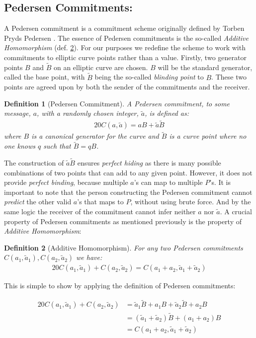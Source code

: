 \documentclass{article}
\newtheorem{definition}{Definition}[section]
\newcommand{\eq}[1]{\begin{alignat*}{20}#1\end{alignat*}}
\newcommand{\blind}[1]{\widetilde{#1}}
\newcommand{\ba}{\blind{a}}
\newcommand{\bB}{\blind{B}}
\begin{document}
\subsection{Pedersen Commitments:} \label{pedersen-commitments}

A Pedersen commitment is a commitment scheme originally defined by
Torben Pryds Pedersen \cite{pedersen}. The essence of Pedersen
commitments is the so-called \textit{Additive Homomorphism}
(def. \ref{pedersen-additive-homomorphism}). For our purposes we
redefine the scheme to work with commitments to elliptic curve points
rather than a value. Firstly, two generator points $B$ and $\bB$
on an elliptic curve are chosen. $B$ will be the standard generator,
called the base point, with $\bB$ being the so-called \textit{blinding
point} to $B$. These two points are agreed upon by both the sender of
the commitments and the receiver.

\begin{definition}[Pedersen Commitment]
	A Pedersen commitment, to some message, $a$, with a randomly chosen
	integer, $\ba$, is defined as:
	\eq{
		C(a, \ba) = aB + \ba\bB
	}
	where $B$ is a canonical generator for the curve and $\bB$
	is a curve point where no one knows $q$ such that $\bB = qB$.
\end{definition}

The construction of $\ba\bB$ ensures \textit{perfect hiding} as there
is many possible combinations of two points that can add to any given
point. However, it does not provide \textit{perfect binding}, because
multiple $a$'s can map to multiple $P$'s. It is important to note that
the person constructing the Pedersen commitment cannot \textit{predict}
the other valid $a$'s that maps to $P$, without using brute force. And
by the same logic the receiver of the commitment cannot infer neither
$a$ nor $\ba$. A crucial property of Pedersen commitments as mentioned
previously is the property of \textit{Additive Homomorphism}:

\begin{definition}[Additive Homomorphism] \label{pedersen-additive-homomorphism}
	For any two Pedersen commitments $C(a_1,\ba_1), C(a_2,\ba_2)$ we have:
	\eq{
		C(a_1,\ba_1) + C(a_2,\ba_2) = C(a_1 + a_2, \ba_1 + \ba_2)
	}
\end{definition}

This is simple to show by applying the definition of Pedersen
commitments: 

\eq{
	C(a_1,\ba_1) + C(a_2,\ba_2) &= \ba_1\bB + a_1B  + \ba_2\bB + a_2B \\
	                            &= (\ba_1 + \ba_2)\bB + (a_1 + a_2)B \\
	                            &= C(a_1 + a_2, \ba_1 + \ba_2)
}
\end{document}
